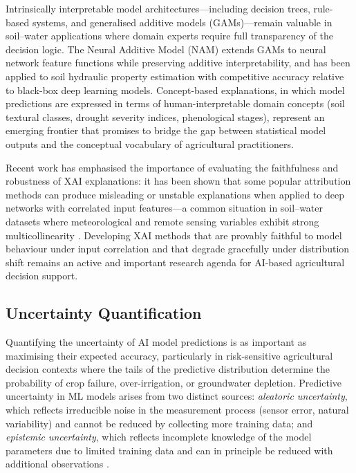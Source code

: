 \documentclass[land,article,submit,pdftex,moreauthors]{Definitions/mdpi}
\numberwithin{equation}{section}
\begin{document}
Intrinsically interpretable model architectures---including decision trees, rule-based systems, and generalised additive models (GAMs)---remain valuable in soil--water applications where domain experts require full transparency of the decision logic. The Neural Additive Model (NAM) \citep{agarwal2021neural} extends GAMs to neural network feature functions while preserving additive interpretability, and has been applied to soil hydraulic property estimation with competitive accuracy relative to black-box deep learning models. Concept-based explanations, in which model predictions are expressed in terms of human-interpretable domain concepts (soil textural classes, drought severity indices, phenological stages), represent an emerging frontier that promises to bridge the gap between statistical model outputs and the conceptual vocabulary of agricultural practitioners.

Recent work has emphasised the importance of evaluating the faithfulness and robustness of XAI explanations: it has been shown that some popular attribution methods can produce misleading or unstable explanations when applied to deep networks with correlated input features---a common situation in soil--water datasets where meteorological and remote sensing variables exhibit strong multicollinearity \citep{adebayo2018sanity}. Developing XAI methods that are provably faithful to model behaviour under input correlation and that degrade gracefully under distribution shift remains an active and important research agenda for AI-based agricultural decision support.

\subsection{Uncertainty Quantification}

Quantifying the uncertainty of AI model predictions is as important as maximising their expected accuracy, particularly in risk-sensitive agricultural decision contexts where the tails of the predictive distribution determine the probability of crop failure, over-irrigation, or groundwater depletion. Predictive uncertainty in ML models arises from two distinct sources: \emph{aleatoric uncertainty}, which reflects irreducible noise in the measurement process (sensor error, natural variability) and cannot be reduced by collecting more training data; and \emph{epistemic uncertainty}, which reflects incomplete knowledge of the model parameters due to limited training data and can in principle be reduced with additional observations \citep{hullermeier2021aleatoric}.
\end{document}

